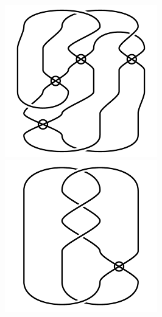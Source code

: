 \begin{figure}[H]
\begin{minipage}[b]{.18\linewidth}
\centering
\includegraphics[width=\linewidth]{../data/virtual_4_42.png}
\end{minipage}
\begin{minipage}[b]{.18\linewidth}
\centering
\includegraphics[width=\linewidth]{../data/virtual_4_43.png}

\end{minipage}
\end{figure}
